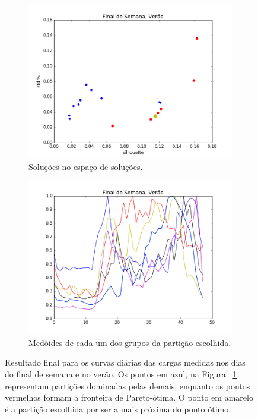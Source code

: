 \begin{figure}[!h]
	\centering
	\begin{subfigure}{.5\textwidth}
		\centering
		\includegraphics[width=.9\linewidth]{figuras/australia_5000/pareto_Final_de_Semana_Verao.png}
		\caption{Soluções no espaço de soluções.}
		\label{fig:pareto_FDS_verao}
	\end{subfigure}%
	\begin{subfigure}{.5\textwidth}
		\centering
		\includegraphics[width=.9\linewidth]{figuras/australia_5000/Final_de_Semana_Verao.png}
		\caption{Medóides de cada um dos grupos da partição escolhida.}
		\label{fig:FDS_verao}
	\end{subfigure}
	\caption{Resultado final para os curvas diárias das cargas medidas nos dias do final de semana e no verão. Os pontos em azul, na Figura ~\ref{fig:pareto_FDS_verao}, representam partições dominadas pelas demais, enquanto os pontos vermelhos formam a fronteira de Pareto-ótima. O ponto em amarelo é a partição escolhida por ser a mais próxima do ponto ótimo.}
	\label{fig:FDS_verao_}
\end{figure}
